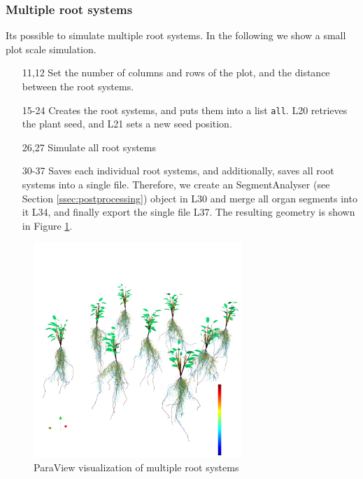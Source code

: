 \subsubsection*{Multiple root systems}

Its possible to simulate multiple root systems. In the following we show a small plot scale simulation.



\begin{itemize}
\item[11,12] Set the number of columns and rows of the plot, and the distance between the root systems.
\item[15-24] Creates the root systems, and puts them into a list \texttt{all}. L20 retrieves the plant seed, and L21 sets a new seed position. 
\item[26,27] Simulate all root systems 
\item[30-37] Saves each individual root systems, and additionally, saves all root systems into a single file. 
Therefore, we create an SegmentAnalyser (see Section \ref{ssec:postprocessing}) object in L30 and merge all organ segments into it L34,  and finally export the single file L37. The resulting geometry is shown in Figure \ref{fig:topics_virtual4}.
\end{itemize}

\begin{figure}
\centering
\includegraphics[width=0.7\textwidth]{figures/topics_virtual4.png}
\caption{ParaView visualization of multiple root systems} \label{fig:topics_virtual4}
\end{figure}


